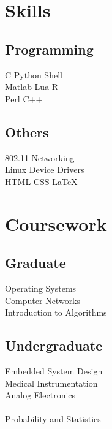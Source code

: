 \documentclass[letterpaper]{deedy-resume} %
\begin{document}
\begin{minipage}[t]{0.25\textwidth} %
\section{Skills}
\subsection{Programming}
C \textbullet{} Python \textbullet{} Shell \\
Matlab \textbullet{} Lua \textbullet{} R \\
Perl \textbullet{} C++
\vspace{\topsep}
\subsection{Others}
802.11 \textbullet{} Networking \textbullet{} \\
Linux Device Drivers \textbullet{} \\
HTML \textbullet{} CSS \textbullet{} \LaTeX
\lsectionspace %
\section{Coursework}
\subsection{Graduate}
\textbullet{} Operating Systems \\
\textbullet{} Computer Networks \\
\textbullet{} Introduction to Algorithms \\
\subsection{Undergraduate}
\textbullet{} Embedded System Design \\
\textbullet{} Medical Instrumentation \\
\textbullet{} Analog Electronics \\
 \\
\textbullet{} Probability and Statistics \\

\end{minipage}
\end{document}
